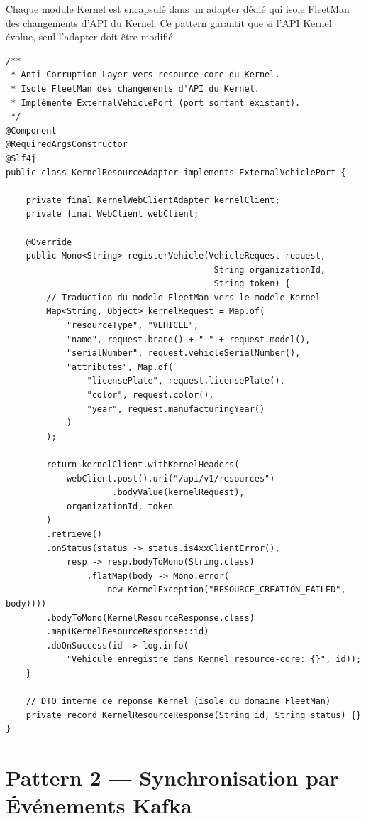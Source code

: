 \documentclass[12pt,a4paper]{report}
\begin{document}
Chaque module Kernel est encapsulé dans un adapter dédié qui isole FleetMan
des changements d'API du Kernel. Ce pattern garantit que si l'API Kernel évolue,
seul l'adapter doit être modifié.

\begin{lstlisting}[style=javaStyle, caption={Pattern ACL — KernelResourceAdapter}]
/**
 * Anti-Corruption Layer vers resource-core du Kernel.
 * Isole FleetMan des changements d'API du Kernel.
 * Implémente ExternalVehiclePort (port sortant existant).
 */
@Component
@RequiredArgsConstructor
@Slf4j
public class KernelResourceAdapter implements ExternalVehiclePort {

    private final KernelWebClientAdapter kernelClient;
    private final WebClient webClient;

    @Override
    public Mono<String> registerVehicle(VehicleRequest request,
                                         String organizationId,
                                         String token) {
        // Traduction du modele FleetMan vers le modele Kernel
        Map<String, Object> kernelRequest = Map.of(
            "resourceType", "VEHICLE",
            "name", request.brand() + " " + request.model(),
            "serialNumber", request.vehicleSerialNumber(),
            "attributes", Map.of(
                "licensePlate", request.licensePlate(),
                "color", request.color(),
                "year", request.manufacturingYear()
            )
        );

        return kernelClient.withKernelHeaders(
            webClient.post().uri("/api/v1/resources")
                     .bodyValue(kernelRequest),
            organizationId, token
        )
        .retrieve()
        .onStatus(status -> status.is4xxClientError(),
            resp -> resp.bodyToMono(String.class)
                .flatMap(body -> Mono.error(
                    new KernelException("RESOURCE_CREATION_FAILED", body))))
        .bodyToMono(KernelResourceResponse.class)
        .map(KernelResourceResponse::id)
        .doOnSuccess(id -> log.info(
            "Vehicule enregistre dans Kernel resource-core: {}", id));
    }

    // DTO interne de reponse Kernel (isole du domaine FleetMan)
    private record KernelResourceResponse(String id, String status) {}
}
\end{lstlisting}

\section{Pattern 2 — Synchronisation par Événements Kafka}
\end{document}
